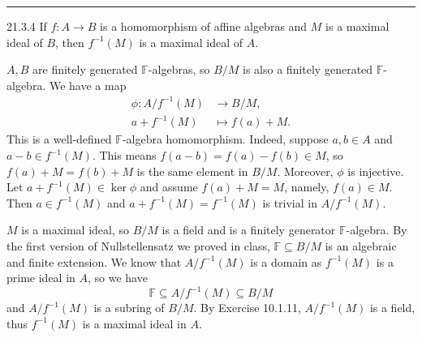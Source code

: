 \documentclass[letterpaper, 12pt]{article}
\begin{document}
\noindent\rule{7in}{2.8pt}
\begin{problem}{21.3.4}
If \(f:A\rightarrow B\) is a homomorphism of affine algebras and \(M\) is a maximal ideal of \(B\), then \(f^{-1}(M)\) is a maximal ideal of \(A\).
\end{problem}
\begin{solution}
\(A,B\) are finitely generated \(\mathbb{F}\)-algebras, so \(B/M\) is also a finitely generated \(\mathbb{F}\)-algebra. We have a map 
\begin{align*}
    \phi: A/f^{-1}(M)&\rightarrow B/M,\\ 
          a+f^{-1}(M)&\mapsto f(a)+M.
\end{align*}
This is a well-defined \(\mathbb{F}\)-algebra homomorphism. Indeed, suppose \(a,b\in A\) and \(a-b\in f^{-1}(M)\). This means \(f(a-b)=f(a)-f(b)\in M\), so \(f(a)+M=f(b)+M\) is the same element in \(B/M\). Moreover, \(\phi\) is injective. Let \(a+f^{-1}(M)\in \ker \phi\) and assume \(f(a)+M=M\), namely, \(f(a)\in M\). Then \(a\in f^{-1}(M)\) and \(a+f^{-1}(M)=f^{-1}(M)\) is trivial in \(A/f^{-1}(M)\). 

\(M\) is a maximal ideal, so \(B/M\) is a field and is a finitely generator \(\mathbb{F}\)-algebra. By the first version of Nullstellensatz we proved in class, \(\mathbb{F}\subseteq B/M\) is an algebraic and finite extension. We know that \(A/f^{-1}(M)\) is a domain as \(f^{-1}(M)\) is a prime ideal in \(A\), so we have 
\[\mathbb{F}\subseteq A/f^{-1}(M)\subseteq B/M\]
and \(A/f^{-1}(M)\) is a subring of \(B/M\). By Exercise 10.1.11, \(A/f^{-1}(M)\) is a field, thus \(f^{-1}(M)\) is a maximal ideal in \(A\). 
\end{solution}
\end{document}
